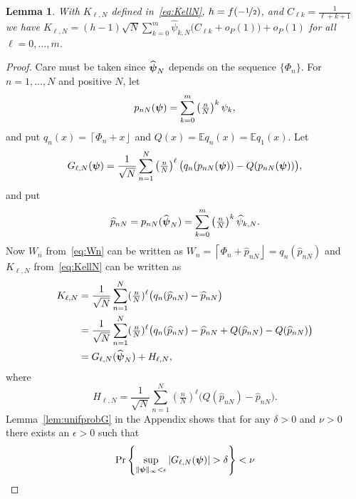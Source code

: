 \documentclass[aap]{imsart}
\newcommand{\prob}{\operatorname{Pr}}
\newcommand{\expect}{{\mathbb E}}
\newcommand{\abs}[1]{\left\vert #1 \right\vert}
\newcommand{\round}[1]{{\left\lceil #1 \right\rfloor}}
\newtheorem{lemma}{Lemma}
\begin{document}
\begin{lemma}\label{lem:Kconvfhalf}
With $K_{\ell,N}$ defined in~\eqref{eq:KellN}, $h = f(-\nicefrac{1}{2})$, and $C_{\ell k} =  \frac{1}{\ell + k + 1}$ we have $K_{\ell,N} = (h - 1) \sqrt{N} \sum_{k=0}^{m}  \widehat{\psi}_{k,N} \big( C_{\ell k} + o_P(1) \big) + o_P(1)$ for all $\ell = 0, \dots, m$.%
\end{lemma}
\begin{proof}
Care must be taken since $\widehat{\boldsymbol{\psi}}_N$ depends on the sequence $\{ \Phi_n \}$.  For $n = 1, \dots, N$ and positive $N$, let
\begin{equation}
p_{nN}(\psibf) = \sum_{k=0}^{m}\left( \tfrac{n}{N}\right)^k \psi_k,
\end{equation}
and put $q_{n}(x) = \round{\Phi_n + x}$ and $Q(x) = \expect q_{n}(x) =  \expect q_{1}(x)$.  Let
\begin{equation}\label{eq:GNdef}
G_{\ell,N}(\psibf) = \frac{1}{\sqrt{N}} \sum_{n=1}^{N}\left( \tfrac{n}{N}\right)^\ell  \big(q_n(p_{nN}(\psibf)) - Q(p_{nN}(\psibf)) \big),
\end{equation}
and put
\begin{equation}\label{eq:hatpnN}
\widehat{p}_{nN} = p_{nN}(\widehat{\psibf}_N) = \sum_{k=0}^m \left(\tfrac{n}{N}\right)^k \widehat{\psi}_{k,N}.
\end{equation}
Now $W_n$ from~\eqref{eq:Wn} can be written as $W_n = \round{\Phi_n + \widehat{p}_{nN}} = q_{n}(\widehat{p}_{nN})$ and $K_{\ell,N}$ from~\eqref{eq:KellN} can be written as
\begin{align*}
K_{\ell,N} &= \frac{1}{\sqrt{N}}\sum_{n=1}^{N}(\tfrac{n}{N})^\ell\big( q_{n}(\widehat{p}_{nN}) - \widehat{p}_{nN}  \big) \\
&= \frac{1}{\sqrt{N}}\sum_{n=1}^{N}(\tfrac{n}{N})^\ell\big(q_{n}(\widehat{p}_{nN}) - \widehat{p}_{nN} + Q(\widehat{p}_{nN}) - Q(\widehat{p}_{nN}) \big) \\
&= G_{\ell,N}(\widehat{\psibf}_N) + H_{\ell,N},
\end{align*}
where 
\begin{equation}\label{eq:HellNdef}
H_{\ell,N} = \frac{1}{\sqrt{N}}\sum_{n=1}^{N}(\tfrac{n}{N})^\ell \big( Q(\widehat{p}_{nN}) - \widehat{p}_{nN} \big).
\end{equation}
Lemma~\ref{lem:unifprobG} in the Appendix shows that for any $\delta >0$ and $\nu > 0$ there exists an $\epsilon > 0$ such that
\[
\prob\left\{ \sup_{\|\psibf\|_{\infty} < \epsilon} \abs{ G_{\ell,N}(\psibf) } > \delta   \right\} < \nu
\]
\end{proof}
\end{document}
